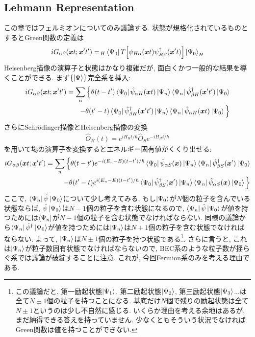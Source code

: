 \documentclass[10.5pt,a4paper]{jreport}
\newcommand{\bx}{\bm{x}}
\newcommand{\hpsi}{\hat{\psi}}
\begin{document}
\subsection{Lehmann Representation}
この章ではフェルミオンについてのみ議論する. 状態が規格化されているものとするとGreen関数の定義は
\begin{eqnarray}
  iG_{\alpha\beta}(\bx t;\bx' t') = \!_H\bra{\Psi_0}T\qty[\psi_{H\alpha}(\bx t)\psi_{H\beta}^\dagger(\bx't)]\ket{\Psi_0}_H
\end{eqnarray}
Heisenberg描像の演算子と状態はかなり複雑だが, 面白くかつ一般的な結果を導くことができる. まず$\qty{\ket{\Psi}}$完全系を挿入:
\begin{eqnarray}
\nonumber  iG_{\alpha\beta}(\bx t;\bx' t') = \sum_n\Big\{\theta(t-t')\bra{\Psi_0}\hat{\psi}_{\alpha H}(\bx t)\ket{\Psi_n}\bra{\Psi_n}\hat{\psi}^\dagger_{\beta H}(\bx't')\ket{\Psi_0}\\
    -\theta(t'-t)\bra{\Psi_0}\hat{\psi}^\dagger_{\beta H}(\bx' t')\ket{\Psi_n}\bra{\Psi_n}\hat{\psi}_{\alpha H}(\bx t)\ket{\Psi_0}\Big\}
\end{eqnarray}
さらにSchr\"odinger描像とHeisenberg描像の変換
\begin{eqnarray}
  \hat{O}_H(t) = e^{iH_Ht/\hbar}\hat{O}_Se^{-iH_Ht/\hbar}
\end{eqnarray}
を用いて場の演算子を変換するとエネルギー固有値がくくり出せる:
\begin{eqnarray}
\nonumber    iG_{\alpha\beta}(\bx t;\bx' t') = \sum_n\Big\{\theta(t-t')e^{-i(E_n-E)(t-t')/\hbar}\bra{\Psi_0}\hat{\psi}_{\alpha S}(\bx)\ket{\Psi_n}\bra{\Psi_n}\hat{\psi}^\dagger_{\beta S}(\bx')\ket{\Psi_0}\\
    -\theta(t'-t)e^{i(E_n-E)(t-t')/\hbar}\bra{\Psi_0}\hat{\psi}^\dagger_{\beta S}(\bx')\ket{\Psi_n}\bra{\Psi_n}\hat{\psi}_{\alpha S}(\bx)\ket{\Psi_0}\Big\}
\end{eqnarray}
ここで, $\bra{\Psi_n}\hpsi\ket{\Psi_0}$について少し考えてみる. もし$\ket{\Psi_0}$が$N$個の粒子を含んでいる状態ならば, $\hpsi\ket{\Psi_0}$は$N-1$個の粒子を含む状態になるので, $\bra{\Psi_n}\hpsi\ket{\Psi_0}$が値を持つためには$\bra{\Psi_n}$が$N-1$個の粒子を含む状態でなければならない. 同様の議論から$\bra{\Psi_n}\hpsi^\dagger\ket{\Psi_0}$が値を持つためには$\ket{\Psi_n}$は$N+1$個の粒子を含む状態でなければならない. よって, $\ket{\Psi_n}$は$N\pm1$個の粒子を持つ状態である\footnote{この議論だと, 第一励起状態$\ket{\Psi_1}$, 第二励起状態$\ket{\Psi_2}$, 第三励起状態$\ket{\Psi_3}$...は全て$N\pm1$個の粒子を持つことになる. 基底だけ$N$個で残りの励起状態は全て$N\pm1$というのは少し不自然に感じる. いくらか理由を考える余地はあるが, まだ納得できる答えを持っていません. 少なくともそういう状況でなければGreen関数は値を持つことができない. }. さらに言うと, これは$\ket{\Psi_n}$が粒子数固有状態でなければならないので, BEC系のような粒子数が揺らぐ系では議論が破綻することに注意. これが, 今回Fermion系のみを考える理由である. 
\end{document}
